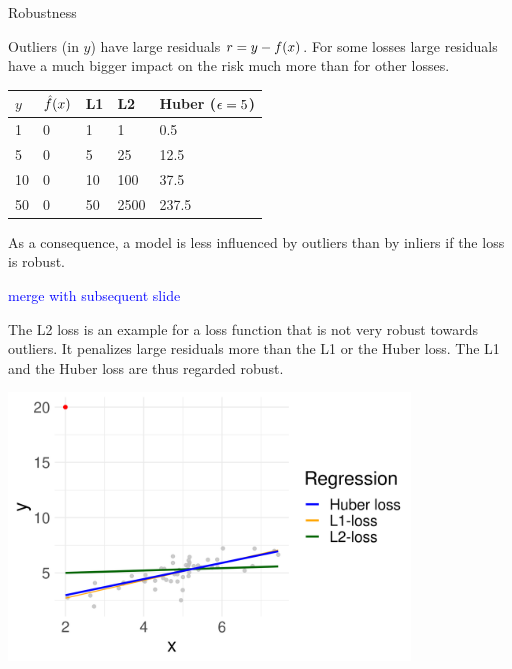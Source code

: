 \begin{vbframe}{Robustness}

Outliers (in $y$) have large residuals $r = y - f(x)$. For some losses large residuals have a much bigger impact on the risk much more than for other losses. 

\begin{table}[]
\begin{tabular}{lllll}
\toprule
$y$  & $\hat{f}(x)$ & L1 & L2 & Huber ($\epsilon = 5$) \\ \midrule 
1 & 0 & 1 & 1 & 0.5 \\ 
5 & 0 & 5 & 25 & 12.5 \\ 
10 & 0 & 10 & 100 & 37.5 \\ 
50 & 0 & 50 & 2500  & 237.5 \\ \bottomrule
\end{tabular}
\end{table}

As a consequence, a model is less influenced by outliers than by inliers if the loss is robust. 

\textcolor{blue}{merge with subsequent slide}

\framebreak 

The L2 loss is an example for a loss function that is not very robust towards outliers. It penalizes large residuals more than the L1 or the Huber loss. The L1 and the Huber loss are thus regarded robust. 

\begin{center}
\includegraphics[width=0.8\textwidth]{figure/robustness.png}
\end{center}

\end{vbframe}

